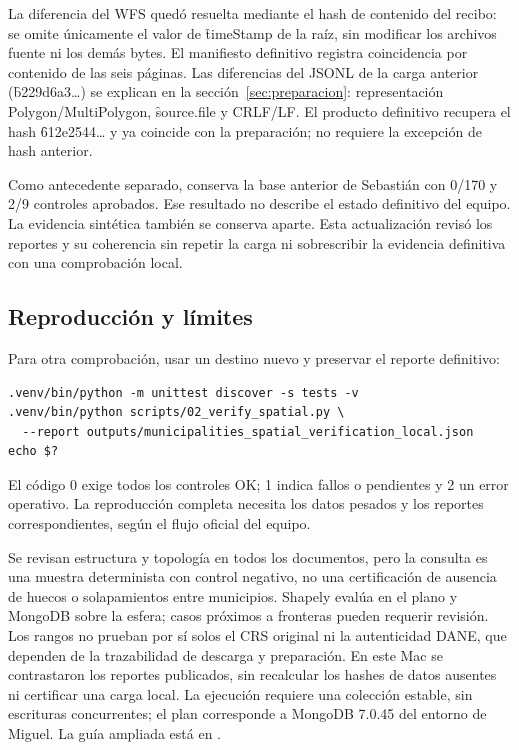 La diferencia del WFS quedó resuelta mediante el hash de contenido del recibo: se omite únicamente el valor de \f{timeStamp} de la raíz, sin modificar los archivos fuente ni los demás bytes. El manifiesto definitivo registra coincidencia por contenido de las seis páginas. Las diferencias del JSONL de la carga anterior (\f{b229d6a3\ldots}) se explican en la sección~\ref{sec:preparacion}: representación Polygon/MultiPolygon, \f{source.file} y CRLF/LF. El producto definitivo recupera el hash \f{612e2544\ldots} y ya coincide con la preparación; no requiere la excepción de hash anterior.

Como antecedente separado,  conserva la base anterior de Sebastián con 0/170 y 2/9 controles aprobados. Ese resultado no describe el estado definitivo del equipo. La evidencia sintética también se conserva aparte. Esta actualización revisó los reportes y su coherencia sin repetir la carga ni sobrescribir la evidencia definitiva con una comprobación local.

\subsection{Reproducción y límites}

Para otra comprobación, usar un destino nuevo y preservar el reporte definitivo:
\begin{verbatim}
.venv/bin/python -m unittest discover -s tests -v
.venv/bin/python scripts/02_verify_spatial.py \
  --report outputs/municipalities_spatial_verification_local.json
echo $?
\end{verbatim}
El código 0 exige todos los controles OK; 1 indica fallos o pendientes y 2 un error operativo. La reproducción completa necesita los datos pesados y los reportes correspondientes, según el flujo oficial del equipo.

Se revisan estructura y topología en todos los documentos, pero la consulta es una muestra determinista con control negativo, no una certificación de ausencia de huecos o solapamientos entre municipios. Shapely evalúa en el plano y MongoDB sobre la esfera; casos próximos a fronteras pueden requerir revisión. Los rangos no prueban por sí solos el CRS original ni la autenticidad DANE, que dependen de la trazabilidad de descarga y preparación. En este Mac se contrastaron los reportes publicados, sin recalcular los hashes de datos ausentes ni certificar una carga local. La ejecución requiere una colección estable, sin escrituras concurrentes; el plan corresponde a MongoDB 7.0.45 del entorno de Miguel. La guía ampliada está en .
